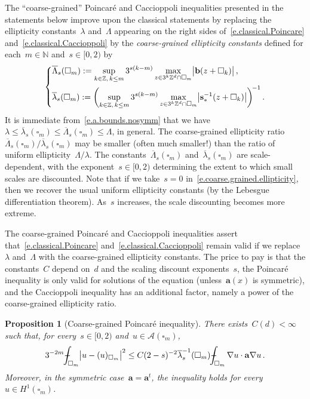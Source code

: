 \documentclass[11pt,twoside]{article} %
\let\oldsquare\square %
\renewcommand{\square}{\oldsquare}
\numberwithin{equation}{section}
\newtheorem{proposition}[theorem]{Proposition}
\theoremstyle{definition}
\let\originalleft\left
\let\originalright\right
\renewcommand{\left}{\mathopen{}\mathclose\bgroup\originalleft}
\renewcommand{\right}{\aftergroup\egroup\originalright}
\newcommand*{\N}{\ensuremath{\mathbb{N}}}
\newcommand*{\Z}{\ensuremath{\mathbb{Z}}}
\newcommand*{\Zd}{\ensuremath{\mathbb{Z}^d}}
\renewcommand{\b}{\ensuremath{\mathbf{b}}}
\newcommand{\s}{\mathbf{s}}
\renewcommand{\a}{\mathbf{a}}
\newcommand{\cu}{\square}
\def\Xint#1{\mathchoice
{\XXint\displaystyle\textstyle{#1}}%
{\XXint\textstyle\scriptstyle{#1}}%
{\XXint\scriptstyle\scriptscriptstyle{#1}}%
{\XXint\scriptscriptstyle\scriptscriptstyle{#1}}%
\!\int}
\def\XXint#1#2#3{{\setbox0=\hbox{$#1{#2#3}{\int}$}
\vcenter{\hbox{$#2#3$}}\kern-.5\wd0}}
\def\fint{\Xint-}
\newcommand{\A}{\mathcal{A}}
\begin{document}
The ``coarse-grained'' Poincar\'e and Caccioppoli inequalities presented in the statements below improve upon the classical statements by replacing the ellipticity constants~$\lambda$ and~$\Lambda$ appearing on the right sides of~\eqref{e.classical.Poincare} and~\eqref{e.classical.Caccioppoli} by the \emph{coarse-grained ellipticity constants} defined for each~$m\in\N$ and~$s\in [0,2)$ by 
\begin{equation}
\label{e.coarse.grained.ellipticity}
\left\{
\begin{aligned}
& \overline{\Lambda}_{s}(\cu_m)
:= 
\sup_{k \in \Z, \, k\leq m} 
3^{s(k-m)} 
\max_{z\in 3^k\Zd \cap \cu_m} 
\bigl| \b(z+\cu_k) \bigr|
\,, \\  &
\overline{\lambda}_{s}(\cu_m) 
:=
\biggl(
\sup_{k \in \Z, \, k\leq m} 
3^{s(k-m)} 
\max_{z\in 3^k\Zd \cap \cu_m} 
\bigl| \s_*^{-1}(z+\cu_k) \bigr|\biggl)^{\!-1}
\,.
\end{aligned}
\right.
\end{equation}
It is immediate from~\eqref{e.a.bounds.nosymm} that we have~$\lambda \leq \overline{\lambda}_{s}(\cu_m) \leq \overline{\Lambda}_{s}(\cu_m)\leq \Lambda$, in general. The coarse-grained ellipticity ratio~$\overline{\Lambda}_{s}(\cu_m)/\overline{\lambda}_{s}(\cu_m) $ may be smaller (often much smaller!) than the ratio of uniform ellipticity~$\Lambda/\lambda$. The constants~$\overline{\Lambda}_{s}(\cu_m)$ and~$\overline{\lambda}_{s}(\cu_m)$ are scale-dependent, with the exponent~$s\in [0,2)$ determining the extent to which small scales are discounted. Note that if we take~$s=0$ in~\eqref{e.coarse.grained.ellipticity}, then we recover the usual uniform ellipticity constants (by the Lebesgue differentiation theorem). As~$s$ increases,  the scale discounting becomes more extreme.

\smallskip

The coarse-grained Poincar\'e and Caccioppoli inequalities assert that~\eqref{e.classical.Poincare} and~\eqref{e.classical.Caccioppoli} remain valid if we replace~$\lambda$ and~$\Lambda$ with the coarse-grained ellipticity constants. The price to pay is that the constants~$C$ depend on~$d$ and the scaling discount exponents~$s$, the Poincar\'e inequality is only valid for solutions of the equation (unless~$\a(x)$ is symmetric), and the Caccioppoli inequality has an additional factor, namely a power of the coarse-grained ellipticity ratio. 
\begin{proposition}[Coarse-grained Poincar\'e inequality]
\label{p.coarse.grained.Poincare}
There exists~$C(d)<\infty$ such that, for every~$s\in [0,2)$ and~$u\in \A(\cu_m)$, 
\begin{equation}
\label{e.coarse.grained.Poincare}
3^{-2m} \fint_{\cu_m} \bigl| u - (u)_{\cu_m} \bigr|^2 
\leq
C(2-s)^{-2} \overline{\lambda}^{-1}_{s} (\cu_m) \fint_{\cu_m} 
\nabla u \cdot \a\nabla u
\,.
\end{equation}
Moreover, in the symmetric case~$\a=\a^t$, the inequality holds for every~$u\in H^1(\cu_m)$. 
\end{proposition}
\end{document}
